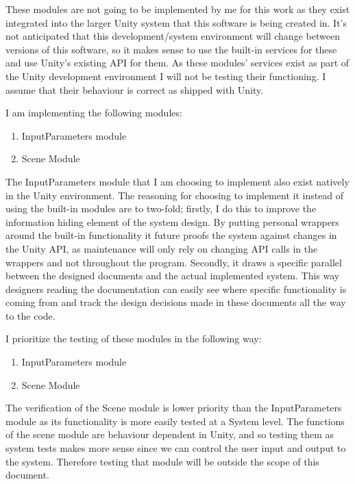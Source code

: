 \documentclass[12pt, titlepage]{article}
\begin{document}
These modules are not going to be implemented by me for this work as they exist 
integrated into the larger Unity system that this software is being created in. 
It's not anticipated that this development/system environment will change 
between versions of this software, so it makes sense to use the built-in 
services for these and use Unity's existing API for them. As these modules' 
services exist as part of the Unity development environment I will not be 
testing their functioning. I assume that their behaviour is correct as shipped 
with Unity.

I am implementing the following modules:

\begin{enumerate}
	\item InputParameters module
	\item Scene Module
\end{enumerate}

The InputParameters module that I am choosing to implement also exist natively 
in the Unity environment. The reasoning for choosing to implement it instead of 
using the built-in modules are to two-fold; firstly, I do this to improve the 
information hiding element of the system design. By putting personal wrappers 
around the built-in functionality it future proofs the system against changes 
in the Unity API, as maintenance will only rely on changing API calls in the 
wrappers and not throughout the program. Secondly, it draws a specific parallel 
between the designed documents and the actual implemented system. This way 
designers reading the documentation can easily see where specific functionality 
is coming from and track the design decisions made in these documents all the 
way to the code.

I prioritize the testing of these modules in the following way:
\begin{enumerate}
	\item InputParameters module
	\item Scene Module
\end{enumerate}

The verification of the Scene module is lower priority than the InputParameters 
module as its functionality is more easily tested at a System level. The 
functions of the scene module are behaviour dependent in Unity, and so testing 
them as system tests makes more sense since we can control the user input and 
output to the system. Therefore testing that module will be outside the scope 
of this document.
\end{document}
